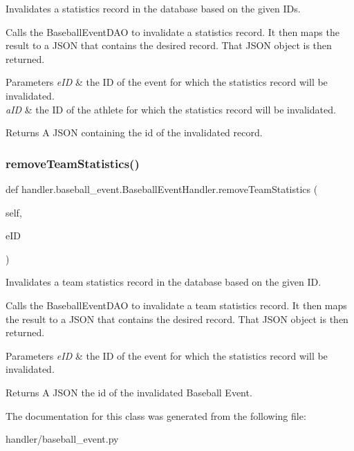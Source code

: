 Invalidates a statistics record in the database based on the given I\+Ds. 

Calls the Baseball\+Event\+D\+AO to invalidate a statistics record. It then maps the result to a J\+S\+ON that contains the desired record. That J\+S\+ON object is then returned.


\begin{DoxyParams}{Parameters}
{\em e\+ID} & the ID of the event for which the statistics record will be invalidated. \\
\hline
{\em a\+ID} & the ID of the athlete for which the statistics record will be invalidated.\\
\hline
\end{DoxyParams}
\begin{DoxyReturn}{Returns}
A J\+S\+ON containing the id of the invalidated record. 
\end{DoxyReturn}
\mbox{\label{classhandler_1_1baseball__event_1_1_baseball_event_handler_a41bed9256d81b41d569d888e266d79df}} 
\subsubsection{\texorpdfstring{remove\+Team\+Statistics()}{removeTeamStatistics()}}
{\footnotesize\ttfamily def handler.\+baseball\+\_\+event.\+Baseball\+Event\+Handler.\+remove\+Team\+Statistics (\begin{DoxyParamCaption}\item[{}]{self,  }\item[{}]{e\+ID }\end{DoxyParamCaption})}



Invalidates a team statistics record in the database based on the given ID. 

Calls the Baseball\+Event\+D\+AO to invalidate a team statistics record. It then maps the result to a J\+S\+ON that contains the desired record. That J\+S\+ON object is then returned.


\begin{DoxyParams}{Parameters}
{\em e\+ID} & the ID of the event for which the statistics record will be invalidated.\\
\hline
\end{DoxyParams}
\begin{DoxyReturn}{Returns}
A J\+S\+ON the id of the invalidated Baseball Event. 
\end{DoxyReturn}


The documentation for this class was generated from the following file\+:\begin{DoxyCompactItemize}
\item 
handler/baseball\+\_\+event.\+py\end{DoxyCompactItemize}
